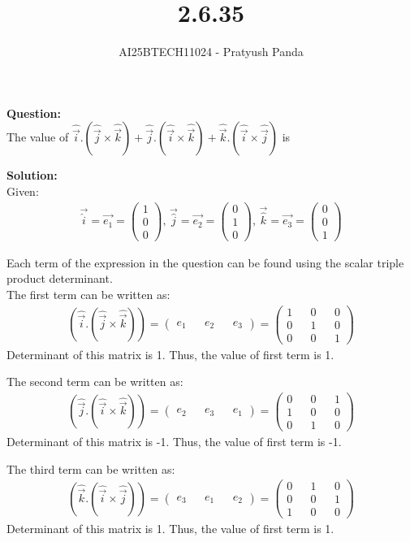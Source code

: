\documentclass{beamer}
\title{2.6.35}
\author{AI25BTECH11024 - Pratyush Panda}
\providecommand{\brak}[1]{\ensuremath{\left(#1\right)}}
\theoremstyle{remark}
\newcommand{\myvec}[1]{\ensuremath{\begin{pmatrix}#1\end{pmatrix}}}
\numberwithin{equation}{section}
\begin{document}
\maketitle

\begin{frame}
\textbf{Question: } \\
The value of $\hat{\Vec{i}}.\brak{\hat{\Vec{j}} \times \hat{\Vec{k}}} + \hat{\Vec{j}}.\brak{\hat{\Vec{i}} \times \hat{\Vec{k}}} + \hat{\Vec{k}}.\brak{\hat{\Vec{i}} \times \hat{\Vec{j}}}$ is \underline{\hspace{2cm}}
\end{frame}

\begin{frame}
\textbf{Solution: } \\
Given:
\begin{align}
\Vec{\hat{i}}=\Vec{e_1}=\myvec{1 \\ 0 \\ 0}, \, \Vec{\hat{j}}=\Vec{e_2}=\myvec{0 \\ 1 \\ 0}, \, \Vec{\hat{k}}=\Vec{e_3}=\myvec{0 \\ 0 \\ 1}
\end{align}

Each term of the expression in the question can be found using the scalar triple product determinant.\\
The first term can be written as:
\begin{align}
\brak{\hat{\Vec{i}}.\brak{\hat{\Vec{j}} \times \hat{\Vec{k}}}} = 
\myvec{e_1 && e_2 && e_3} =
\myvec{1 && 0 && 0 \\
       0 && 1 && 0 \\
       0 && 0 && 1}
\end{align}
Determinant of this matrix is 1. Thus, the value of first term is 1.
\end{frame}

\begin{frame}
The second term can be written as:
\begin{align}
\brak{\hat{\Vec{j}}.\brak{\hat{\Vec{i}} \times \hat{\Vec{k}}}} = 
\myvec{e_2 && e_3 && e_1} =
\myvec{0 && 0 && 1 \\
       1 && 0 && 0 \\
       0 && 1 && 0}
\end{align}
Determinant of this matrix is -1. Thus, the value of first term is -1.

The third term can be written as:
\begin{align}
\brak{\hat{\Vec{k}}.\brak{\hat{\Vec{i}} \times \hat{\Vec{j}}}} = 
\myvec{e_3 && e_1 && e_2} =
\myvec{0 && 1 && 0 \\
       0 && 0 && 1 \\
       1 && 0 && 0}
\end{align}
Determinant of this matrix is 1. Thus, the value of first term is 1.
\end{frame}
\end{document}
